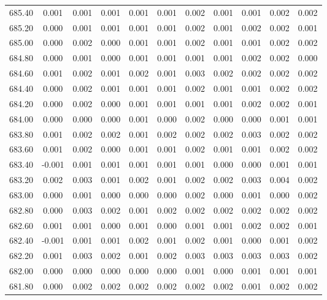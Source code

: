 \begin{longtable}{cccccccccc}
    685.40 &  0.001 &  0.001 &  0.001 &  0.001 &  0.001 &  0.002 &  0.001 &  0.001 &  0.002 &  0.002 \\
    685.20 &  0.000 &  0.001 &  0.001 &  0.001 &  0.001 &  0.002 &  0.001 &  0.002 &  0.002 &  0.001 \\
    685.00 &  0.000 &  0.002 &  0.000 &  0.001 &  0.001 &  0.002 &  0.001 &  0.001 &  0.002 &  0.002 \\
    684.80 &  0.000 &  0.001 &  0.000 &  0.001 &  0.001 &  0.001 &  0.001 &  0.002 &  0.002 &  0.000 \\
    684.60 &  0.001 &  0.002 &  0.001 &  0.002 &  0.001 &  0.003 &  0.002 &  0.002 &  0.002 &  0.002 \\
    684.40 &  0.000 &  0.002 &  0.001 &  0.001 &  0.001 &  0.002 &  0.001 &  0.001 &  0.002 &  0.002 \\
    684.20 &  0.000 &  0.002 &  0.000 &  0.001 &  0.001 &  0.001 &  0.001 &  0.002 &  0.002 &  0.001 \\
    684.00 &  0.000 &  0.000 &  0.000 &  0.001 &  0.000 &  0.002 &  0.000 &  0.000 &  0.001 &  0.001 \\
    683.80 &  0.001 &  0.002 &  0.002 &  0.001 &  0.002 &  0.002 &  0.002 &  0.003 &  0.002 &  0.002 \\
    683.60 &  0.001 &  0.002 &  0.000 &  0.001 &  0.001 &  0.002 &  0.001 &  0.001 &  0.002 &  0.002 \\
    683.40 & -0.001 &  0.001 &  0.001 &  0.001 &  0.001 &  0.001 &  0.000 &  0.000 &  0.001 &  0.001 \\
    683.20 &  0.002 &  0.003 &  0.001 &  0.002 &  0.001 &  0.002 &  0.002 &  0.003 &  0.004 &  0.002 \\
    683.00 &  0.000 &  0.001 &  0.000 &  0.000 &  0.000 &  0.002 &  0.000 &  0.001 &  0.000 &  0.002 \\
    682.80 &  0.000 &  0.003 &  0.002 &  0.001 &  0.002 &  0.002 &  0.002 &  0.002 &  0.002 &  0.002 \\
    682.60 &  0.001 &  0.001 &  0.000 &  0.001 &  0.000 &  0.001 &  0.001 &  0.002 &  0.002 &  0.001 \\
    682.40 & -0.001 &  0.001 &  0.001 &  0.002 &  0.001 &  0.002 &  0.001 &  0.000 &  0.001 &  0.002 \\
    682.20 &  0.001 &  0.003 &  0.002 &  0.001 &  0.002 &  0.003 &  0.003 &  0.003 &  0.003 &  0.002 \\
    682.00 &  0.000 &  0.000 &  0.000 &  0.000 &  0.000 &  0.001 &  0.000 &  0.001 &  0.001 &  0.001 \\
    681.80 &  0.000 &  0.002 &  0.002 &  0.002 &  0.002 &  0.002 &  0.002 &  0.001 &  0.002 &  0.002 \\

\end{longtable}
